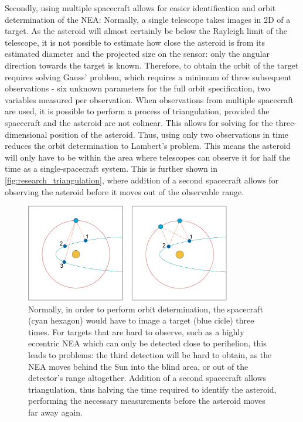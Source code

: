 Secondly, using multiple spacecraft allows for easier identification and orbit determination of the NEA: Normally, a single telescope takes images in 2D of a target. As the asteroid will almost certainly be below the Rayleigh limit of the telescope, it is not possible to estimate how close the asteroid is from its estimated diameter and the projected size on the sensor: only the angular direction towards the target is known. Therefore, to obtain the orbit of the target requires solving Gauss' problem, which requires a minimum of three subsequent observations - six unknown parameters for the full orbit specification, two variables measured per observation. When observations from multiple spacecraft are used, it is possible to perform a process of triangulation, provided the spacecraft and the asteroid are not colinear. This allows for solving for the three-dimensional position of the asteroid. Thus, using only two observations in time reduces the orbit determination to Lambert's problem. This means the asteroid will only have to be within the area where telescopes can observe it for half the time as a single-spacecraft system. This is further shown in \autoref{fig:research_triangulation}, where addition of a second spacecraft allows for observing the asteroid before it moves out of the observable range.\\

\begin{figure}[htbp]
 \centering
 \includegraphics[width=0.8\textwidth]{img/research_triangulation.png}
 \caption{Normally, in order to perform orbit determination, the spacecraft (cyan hexagon) would have to image a target (blue cicle) three times. For targets that are hard to observe, such as a highly eccentric NEA which can only be detected close to perihelion, this leads to problems: the third detection will be hard to obtain, as the NEA moves behind the Sun into the blind area, or out of the detector's range altogether. Addition of a second spacecraft allows triangulation, thus halving the time required to identify the asteroid, performing the necessary measurements before the asteroid moves far away again.}
 \label{fig:research_triangulation}
\end{figure}



